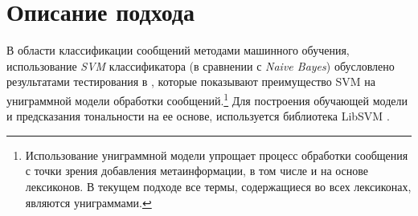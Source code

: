 \section{Описание подхода}
    \label{sec:buildingApproachDescription}
    В области классификации сообщений методами машинного обучения, использование
    {\it SVM} классификатора (в сравнении с {\it Naive Bayes}) обусловлено результатами
    тестирования в \cite{svmAdvantages}, которые показывают преимущество SVM на униграммной
    модели обработки сообщений.\footnote{
        Использование униграммной модели упрощает процесс обработки сообщения с
        точки зрения добавления метаинформации, в том числе и на основе лексиконов.
        В текущем подходе все термы, содержащиеся во всех лексиконах, являются
        униграммами.
    }
    Для построения обучающей модели и предсказания
    тональности на ее основе, используется библиотека LibSVM \cite{svmClassifier}.

